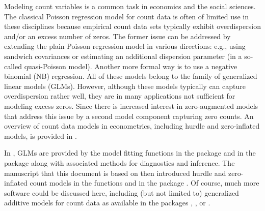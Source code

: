 \documentclass[article]{jss}
\newcommand{\fct}[1]{\code{#1()}}
\begin{document}
Modeling count variables is a common task in economics and the social sciences.
The classical Poisson regression model for count data is often of limited use in
these disciplines because empirical count data sets typically exhibit
overdispersion and/or an excess number of zeros. The former issue can be
addressed by extending  the plain Poisson regression model in various
directions: e.g., using sandwich covariances or estimating an additional
dispersion parameter (in a so-called quasi-Poisson model). Another more formal
way is to use a negative binomial (NB) regression. All of these models belong to
the family of generalized linear models (GLMs). However, although these models
typically can capture overdispersion rather well, they are in many applications
not sufficient for  modeling excess zeros. Since \cite{Mullahy:1986} there is
increased interest in zero-augmented models that address this issue by a second
model component capturing zero counts. An overview of count data models in
econometrics, including  hurdle and zero-inflated models, is provided in
\cite{Cameron+Trivedi:2013}.

In  \citep{R}, GLMs are provided by the model fitting functions
\fct{glm} in the  package and \fct{glm.nb} in the  package
\citep[][Chapter~7.4]{Venables+Ripley:2002} along with associated methods for
diagnostics and inference. The manuscript that this document is based on
\citep{Zeileis+Kleiber+Jackman:2008} then introduced hurdle and zero-inflated
count models in the functions \fct{hurdle} and \fct{zeroinfl} in the 
package \citep{Jackman:2015}. Of course, much more software could be discussed
here, including (but not limited to) generalized additive models for count data
as available in the  packages  \cite{Wood:2006}, 
 \citep{Stasinopoulos+Rigby:2007}, or  \citep{Yee:2009}.



\end{document}
